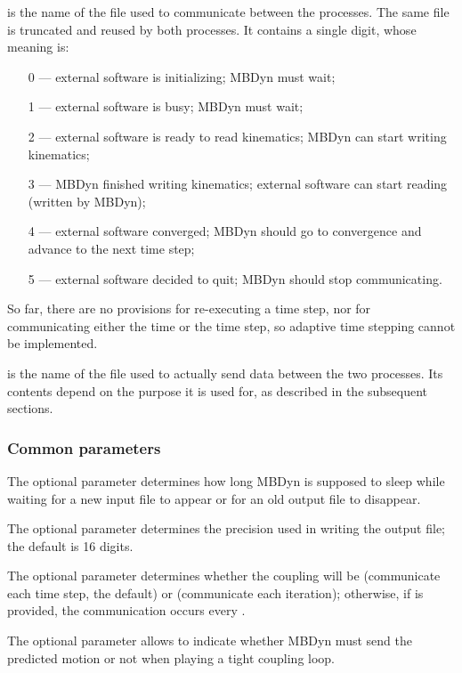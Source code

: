  is the name of the file used to communicate
between the processes.
The same file is truncated and reused by both processes.
It contains a single digit, whose meaning is:
\begin{itemize}
\item[0 ---] external software is initializing; MBDyn must wait;
\item[1 ---] external software is busy; MBDyn must wait;
\item[2 ---] external software is ready to read kinematics; MBDyn can start writing kinematics;
\item[3 ---] MBDyn finished writing kinematics; external software can start reading (written by MBDyn);
\item[4 ---] external software converged; MBDyn should go to convergence and advance to the next time step;
\item[5 ---] external software decided to quit; MBDyn should stop communicating.
\end{itemize}
So far, there are no provisions for re-executing a time step,
nor for communicating either the time or the time step,
so adaptive time stepping cannot be implemented.

 is the name of the file used to actually send data
between the two processes.
Its contents depend on the purpose it is used for,
as described in the subsequent sections.



\subsubsection{Common parameters}
The optional parameter  determines how long MBDyn
is supposed to sleep while waiting for a new input file to appear
or for an old output file to disappear.

The optional parameter  determines the precision
used in writing the output file; the default is 16 digits.

The optional parameter  determines whether the coupling
will be  (communicate each time step, the default) or
 (communicate each iteration); otherwise, if 
is provided, the communication occurs every .

The optional parameter  allows to indicate
whether MBDyn must send the predicted motion or not when playing
a tight coupling loop.

